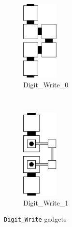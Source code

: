 \begin{figure}[H]
    \centering
    \begin{subfigure}[t]{0.2\textwidth}
        \centering
        \includegraphics[width=0.2\textwidth]{write/write_0}
        \caption{\label{fig:write_0} Digit\_Write\_0}
    \end{subfigure}%
    ~
    \begin{subfigure}[t]{0.2\textwidth}
        \centering
        \includegraphics[width=0.2\textwidth]{write/write_1}
        \caption{\label{fig:write_1} Digit\_Write\_1}
    \end{subfigure}%
    \caption{\label{fig:digit_write} {\tt Digit\_Write} gadgets}
\end{figure}